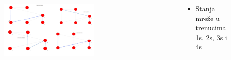 \documentclass{beamer}
\begin{document}
\begin{frame}
\begin{columns}[T]
   \begin{column}{.5\textwidth}
\begin{figure}[t]
		\includegraphics[width=0.6\textwidth]{slike/1.png}
\end{figure}
 \end{column}

\begin{column}{.5\textwidth}

   \bigskip
   
   \bigskip
   
  \begin{block}{}
\begin{itemize}

	\item	Stanja mre\v ze u trenucima 1s, 2s, 3s i 4s
	 \end{itemize}
\end{block}{}
\end{column}
\end{columns}
\end{frame}
\end{document}
